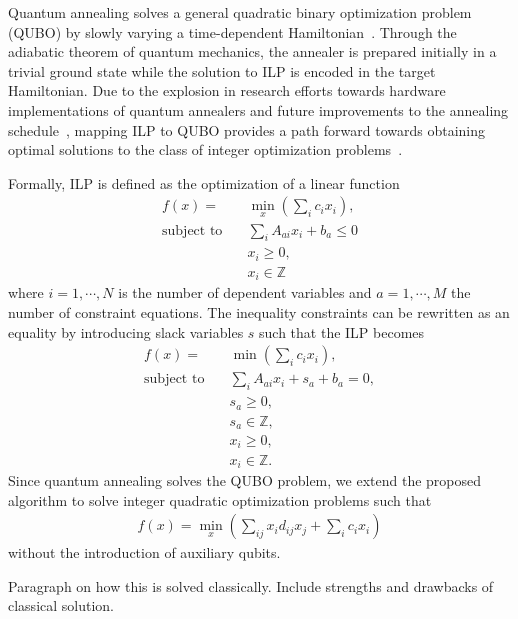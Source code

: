 \documentclass[prd,twocolumn,tightenlines,preprintnumbers,showpacs,superscriptaddress,notitlepage,nofootinbib,eqsecnum,floatfix,longbibliography]{revtex4}
\begin{document}
Quantum annealing solves a general quadratic binary optimization problem (QUBO) by slowly varying a time-dependent Hamiltonian~\cite{}. Through the adiabatic theorem of quantum mechanics, the annealer is prepared initially in a trivial ground state while the solution to ILP is encoded in the target Hamiltonian. Due to the explosion in research efforts towards hardware implementations of quantum annealers and future improvements to the annealing schedule~\cite{}, mapping ILP to QUBO provides a path forward towards obtaining optimal solutions to the class of integer optimization problems~\cite{2018Glover}.

Formally, ILP is defined as the optimization of a linear function
{\color{blue}
\begin{align}
f(x) = &\min\limits_{x}(\sum_i c_i x_i),\\
\textrm{subject to} \quad & \sum_i A_{ai}x_i +b_a \leq 0 \\
& x_i \geq 0,\\
& x_i \in \mathbb{Z}
\end{align}
}
where $i=1, \cdots,  N$ is the number of dependent variables and $a=1, \cdots, M$ the number of constraint equations. The inequality constraints can be rewritten as an equality by introducing slack variables $s$ such that the ILP becomes
{\color{blue}
\begin{align}
f(x) = &\min(\sum_i c_i x_i),\\
\textrm{subject to} \quad & \sum_i A_{a i}x_i + s_a + b_a = 0,\\
& s_a \geq 0,\\
& s_a \in \mathbb{Z},\\
& x_i \geq 0,\\
& x_i \in \mathbb{Z}.
\end{align}
}
Since quantum annealing solves the QUBO problem, we extend the proposed algorithm to solve integer quadratic optimization problems such that
{\color{blue}
\begin{align}
f(x) = \min\limits_{x}(\sum_{ij} x_i d_{ij} x_j + \sum_i c_i x_i)
\end{align}
}
without the introduction of auxiliary qubits.

{\color{red} Paragraph on how this is solved classically. Include strengths and drawbacks of classical solution.}
\end{document}
